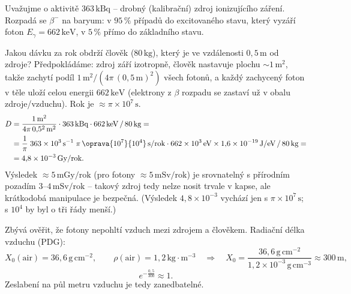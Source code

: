 \begin{priklad}
Uvažujme  o aktivitě \(363\,\text{kBq}\) – drobný (kalibrační)
zdroj ionizujícího záření. Rozpadá se \(\beta^-\) na baryum: v \(95\,\%\)
případů do excitovaného stavu, který vyzáří foton
\(E_\gamma = 662\,\text{keV}\), v \(5\,\%\) přímo do základního stavu.

\begin{center}
\end{center}

Jakou dávku za rok obdrží člověk (\(80\,\text{kg}\)), který je ve vzdálenosti
\(0{,}5\,\text{m}\) od zdroje? Předpokládáme: zdroj září izotropně, člověk
nastavuje plochu \(\sim 1\,\text{m}^2\), takže zachytí podíl
\(1\,\text{m}^2/(4\pi\,(0{,}5\,\text{m})^2)\) všech fotonů, a každý
zachycený foton v těle uloží celou energii \(662\,\text{keV}\) (elektrony
z \(\beta\) rozpadu se zastaví už v obalu zdroje/vzduchu). Rok je
\(\approx \pi\times 10^7\,\text{s}\).
\begin{align*}
  D &= \frac{1\,\text{m}^2}{4\pi\, 0{,}5^2\,\text{m}^2}\cdot 363\,\text{kBq}
       \cdot 662\,\text{keV} \,/\, 80\,\text{kg} = \\
    &= \frac{1}{\pi}\; 363\times10^{3}\,\text{s}^{-1}\;
       \pi\, \oprava{10^{7}}{10^{4}}\,\text{s}/\text{rok}
       \cdot 662\times10^{3}\,\text{eV}\times 1{,}6\times10^{-19}\,\text{J}/\text{eV}
       \,/\, 80\,\text{kg} = \\
    &= 4{,}8\times10^{-3}\,\text{Gy}/\text{rok}.
\end{align*}
Výsledek \(\approx 5\,\text{mGy}/\text{rok}\) (pro fotony \(\approx 5\,\text{mSv}/\text{rok}\))
je srovnatelný s přírodním pozadím \(3\)–\(4\,\text{mSv}/\text{rok}\) – takový
zdroj tedy nelze nosit trvale v kapse, ale krátkodobá manipulace je
bezpečná. (Výsledek \(4{,}8\times10^{-3}\) vychází jen s
\(\pi\times10^{7}\,\text{s}\); s \(10^4\) by byl o tři řády menší.)

Zbývá ověřit, že fotony nepohltí vzduch mezi zdrojem a člověkem.
Radiační délka vzduchu (PDG):
\[
  X_0(\text{air}) = 36{,}6\,\text{g}\,\text{cm}^{-2}, \qquad
  \rho(\text{air}) = 1{,}2\,\text{kg}\cdot\text{m}^{-3}
  \quad\Rightarrow\quad X_0 = \frac{36{,}6\,\text{g}\,\text{cm}^{-2}}{1{,}2\times10^{-3}\,\text{g}\,\text{cm}^{-3}}
  \approx 300\,\text{m},
\]
\[
  e^{-\frac{0{,}5}{300}} \approx 1 .
\]
Zeslabení na půl metru vzduchu je tedy zanedbatelné.
\end{priklad}

